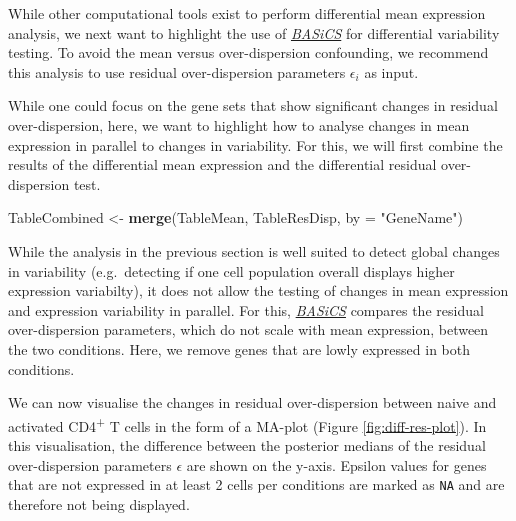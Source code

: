 \documentclass[9pt,a4paper,]{extarticle}
\newenvironment{Shaded}{\begin{snugshade}}{\end{snugshade}}
\newcommand{\CommentTok}[1]{\textcolor[rgb]{0.56,0.35,0.01}{\textit{#1}}}
\newcommand{\DataTypeTok}[1]{\textcolor[rgb]{0.13,0.29,0.53}{#1}}
\newcommand{\DecValTok}[1]{\textcolor[rgb]{0.00,0.00,0.81}{#1}}
\newcommand{\KeywordTok}[1]{\textcolor[rgb]{0.13,0.29,0.53}{\textbf{#1}}}
\newcommand{\NormalTok}[1]{#1}
\newcommand{\OperatorTok}[1]{\textcolor[rgb]{0.81,0.36,0.00}{\textbf{#1}}}
\newcommand{\StringTok}[1]{\textcolor[rgb]{0.31,0.60,0.02}{#1}}
\begin{document}
While other computational tools exist to perform differential mean expression
analysis, we next want to highlight the use of \emph{\href{https://bioconductor.org/packages/3.11/BASiCS}{BASiCS}} for
differential variability testing.
To avoid the mean versus over-dispersion confounding, we recommend this analysis
to use residual over-dispersion parameters \(\epsilon_i\) as input.

While one could focus on the gene sets that show significant changes in
residual over-dispersion, here, we want to highlight how to analyse
changes in mean expression in parallel to changes in variability.
For this, we will first combine the results of the differential mean expression
and the differential residual over-dispersion test.

\begin{Shaded}
\begin{Highlighting}[]
\NormalTok{TableCombined <-}\StringTok{ }\KeywordTok{merge}\NormalTok{(TableMean, TableResDisp, }\DataTypeTok{by =} \StringTok{"GeneName"}\NormalTok{)}
\end{Highlighting}
\end{Shaded}

While the analysis in the previous section is well suited to detect global
changes in variability (e.g.~detecting if one cell population overall displays
higher expression variabilty), it does not allow the testing of changes in
mean expression and expression variability in parallel.
For this, \emph{\href{https://bioconductor.org/packages/3.11/BASiCS}{BASiCS}} compares the residual over-dispersion
parameters, which do not scale with mean expression, between the two conditions.
Here, we remove genes that are lowly expressed in both conditions.

\begin{Shaded}
\end{Shaded}

We can now visualise the changes in residual over-dispersion between naive and
activated CD4\textsuperscript{+} T cells in the form of a MA-plot
(Figure \ref{fig:diff-res-plot}).
In this visualisation, the difference between the posterior medians of the
residual over-dispersion parameters \(\epsilon\) are shown on the y-axis.
Epsilon values for genes that are not expressed in at least 2 cells per
conditions are marked as \texttt{NA} and are therefore not being displayed.
\end{document}
